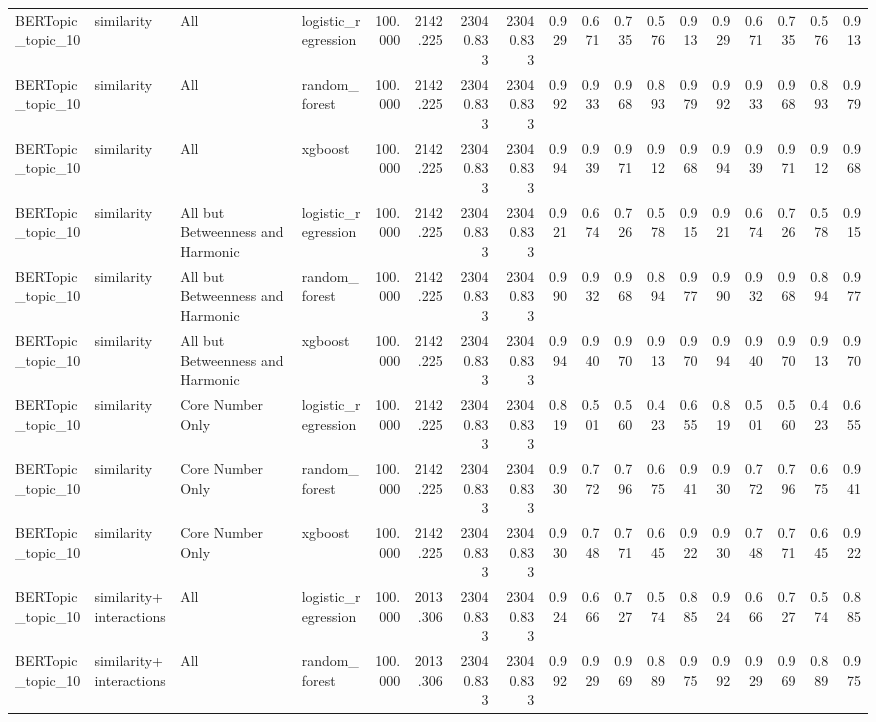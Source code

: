 \begin{tabular}{llllrrrrrrrrrrrrrr}
BERTopic\_topic\_10 & similarity & All & logistic\_regression & 100.000 & 2142.225 & 23040.833 & 23040.833 & 0.929 & 0.671 & 0.735 & 0.576 & 0.913 & 0.929 & 0.671 & 0.735 & 0.576 & 0.913 \\
BERTopic\_topic\_10 & similarity & All & random\_forest & 100.000 & 2142.225 & 23040.833 & 23040.833 & 0.992 & 0.933 & 0.968 & 0.893 & 0.979 & 0.992 & 0.933 & 0.968 & 0.893 & 0.979 \\
BERTopic\_topic\_10 & similarity & All & xgboost & 100.000 & 2142.225 & 23040.833 & 23040.833 & 0.994 & 0.939 & 0.971 & 0.912 & 0.968 & 0.994 & 0.939 & 0.971 & 0.912 & 0.968 \\
BERTopic\_topic\_10 & similarity & All but Betweenness and Harmonic & logistic\_regression & 100.000 & 2142.225 & 23040.833 & 23040.833 & 0.921 & 0.674 & 0.726 & 0.578 & 0.915 & 0.921 & 0.674 & 0.726 & 0.578 & 0.915 \\
BERTopic\_topic\_10 & similarity & All but Betweenness and Harmonic & random\_forest & 100.000 & 2142.225 & 23040.833 & 23040.833 & 0.990 & 0.932 & 0.968 & 0.894 & 0.977 & 0.990 & 0.932 & 0.968 & 0.894 & 0.977 \\
BERTopic\_topic\_10 & similarity & All but Betweenness and Harmonic & xgboost & 100.000 & 2142.225 & 23040.833 & 23040.833 & 0.994 & 0.940 & 0.970 & 0.913 & 0.970 & 0.994 & 0.940 & 0.970 & 0.913 & 0.970 \\
BERTopic\_topic\_10 & similarity & Core Number Only & logistic\_regression & 100.000 & 2142.225 & 23040.833 & 23040.833 & 0.819 & 0.501 & 0.560 & 0.423 & 0.655 & 0.819 & 0.501 & 0.560 & 0.423 & 0.655 \\
BERTopic\_topic\_10 & similarity & Core Number Only & random\_forest & 100.000 & 2142.225 & 23040.833 & 23040.833 & 0.930 & 0.772 & 0.796 & 0.675 & 0.941 & 0.930 & 0.772 & 0.796 & 0.675 & 0.941 \\
BERTopic\_topic\_10 & similarity & Core Number Only & xgboost & 100.000 & 2142.225 & 23040.833 & 23040.833 & 0.930 & 0.748 & 0.771 & 0.645 & 0.922 & 0.930 & 0.748 & 0.771 & 0.645 & 0.922 \\
BERTopic\_topic\_10 & similarity+interactions & All & logistic\_regression & 100.000 & 2013.306 & 23040.833 & 23040.833 & 0.924 & 0.666 & 0.727 & 0.574 & 0.885 & 0.924 & 0.666 & 0.727 & 0.574 & 0.885 \\
BERTopic\_topic\_10 & similarity+interactions & All & random\_forest & 100.000 & 2013.306 & 23040.833 & 23040.833 & 0.992 & 0.929 & 0.969 & 0.889 & 0.975 & 0.992 & 0.929 & 0.969 & 0.889 & 0.975 \\

\end{tabular}
